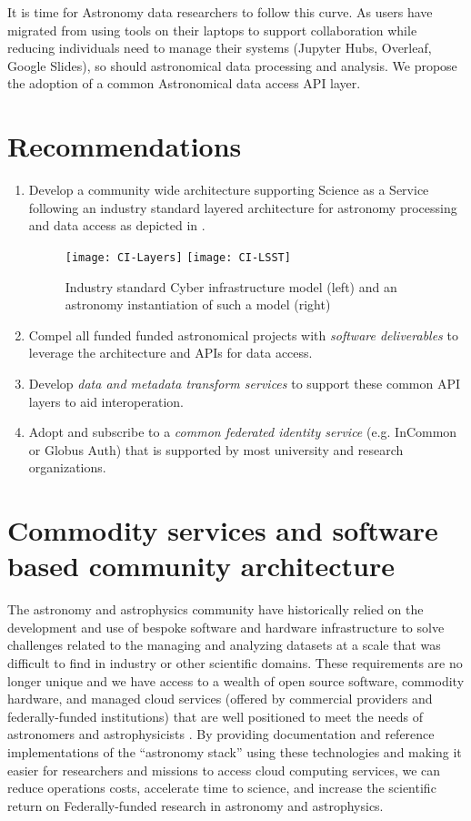 It is time for Astronomy data researchers to follow this curve. As users have migrated
from using tools on their laptops to support collaboration while reducing
individuals need to manage their systems (Jupyter Hubs, Overleaf, Google Slides),
so should astronomical data processing and analysis. We propose the adoption of
a common Astronomical data access \gls{API} layer.


\section{Recommendations }
\begin{enumerate}
 \item Develop a community wide architecture supporting Science as a Service following
	an industry  standard layered architecture for astronomy processing and data access as
depicted in .


\begin{figure}
\centering
\texttt{[image: CI-Layers]}
\texttt{[image: CI-LSST]}
\caption{Industry standard Cyber infrastructure model (left) and an astronomy instantiation of such a model (right)\label{fig:ci}}
\end{figure}

\item Compel all funded funded astronomical projects with \emph{software deliverables} to  leverage the architecture and  APIs for data access.

\item Develop \emph{data and \gls{metadata} transform services}
to support these common \gls{API} layers to aid interoperation.

\item Adopt and subscribe to a \emph{common federated identity service} (e.g. InCommon or
Globus Auth) that is supported by most university and research organizations.
\end{enumerate}




\section{Commodity services and software based community architecture} \label{sec:refarc}
The astronomy and astrophysics community have historically relied on the development and use of bespoke software and hardware infrastructure to solve challenges related to the managing and analyzing datasets at a scale that was difficult to find in industry or other scientific domains.
These requirements are no longer unique and we have access to a wealth of open source software, commodity hardware, and managed cloud services (offered by commercial providers and federally-funded institutions) that are well positioned to meet the needs of astronomers and astrophysicists \cite{2019AAS...23345706M, 2019AAS...23324505B}.
By providing documentation and reference implementations of the “astronomy \gls{stack}” using these technologies and making it easier for researchers and missions to access cloud computing services, we can reduce operations costs, accelerate time to science, and increase the scientific return on Federally-funded research in astronomy and astrophysics.


